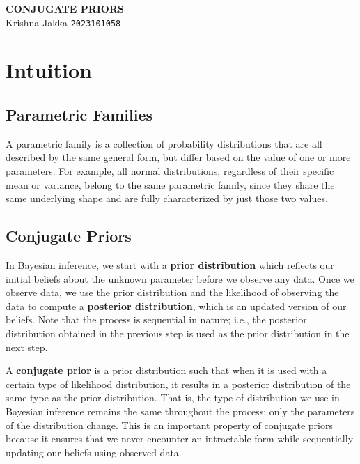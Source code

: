 \documentclass[11pt]{article}
\begin{document}
\begin{center}
  {\LARGE\bfseries\color{headingblue} CONJUGATE PRIORS}\\[0.5em]
  {\large Krishna Jakka \quad \texttt{2023101058}}
\end{center}

\vspace{0.5em}

\section{Intuition}

\subsection{Parametric Families}

A parametric family is a collection of probability distributions that are all described by the same general form, but differ based on the value of one or more parameters. For example, all normal distributions, regardless of their specific mean or variance, belong to the same parametric family, since they share the same underlying shape and are fully characterized by just those two values.

\subsection{Conjugate Priors}

In Bayesian inference, we start with a \textbf{prior distribution} which reflects our initial beliefs about the unknown parameter before we observe any data. Once we observe data, we use the prior distribution and the likelihood of observing the data to compute a \textbf{posterior distribution}, which is an updated version of our beliefs. Note that the process is sequential in nature; i.e., the posterior distribution obtained in the previous step is used as the prior distribution in the next step.

A \textbf{conjugate prior} is a prior distribution such that when it is used with a certain type of likelihood distribution, it results in a posterior distribution of the same type as the prior distribution. That is, the type of distribution we use in Bayesian inference remains the same throughout the process; only the parameters of the distribution change. This is an important property of conjugate priors because it ensures that we never encounter an intractable form while sequentially updating our beliefs using observed data.
\end{document}
